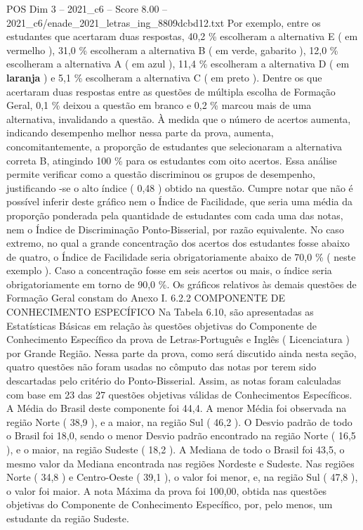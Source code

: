 \begin{textsample}{POS Dim 3 – 2021\_c6 – Score 8.00 – 2021\_c6/enade\_2021\_letras\_ing\_8809dcbd12.txt}
Por exemplo, entre os estudantes que acertaram duas respostas, 40,2 \% escolheram a alternativa E ( em vermelho ), 31,0 \% escolheram a alternativa B ( em verde, gabarito ), 12,0 \% escolheram a alternativa A ( em azul ), 11,4 \% escolheram a alternativa D ( em \textbf{laranja} ) e 5,1 \% escolheram a alternativa C ( em preto ).
Dentre os que acertaram duas respostas entre as questões de múltipla escolha de Formação Geral, 0,1 \% deixou a questão em branco e 0,2 \% marcou mais de uma alternativa, invalidando a questão.
À medida que o número de acertos aumenta, indicando desempenho melhor nessa parte da prova, aumenta, concomitantemente, a proporção de estudantes que selecionaram a alternativa correta B, atingindo 100 \% para os estudantes com oito acertos.
Essa análise permite verificar como a questão discriminou os grupos de desempenho, justificando -se o alto índice ( 0,48 ) obtido na questão.
Cumpre notar que não é possível inferir deste gráfico nem o Índice de Facilidade, que seria uma média da proporção ponderada pela quantidade de estudantes com cada uma das notas, nem o Índice de Discriminação Ponto-Bisserial, por razão equivalente.
No caso extremo, no qual a grande concentração dos acertos dos estudantes fosse abaixo de quatro, o Índice de Facilidade seria obrigatoriamente abaixo de 70,0 \% ( neste exemplo ).
Caso a concentração fosse em seis acertos ou mais, o índice seria obrigatoriamente em torno de 90,0 \%.
Os gráficos relativos às demais questões de Formação Geral constam do Anexo I. 6.2.2 COMPONENTE DE CONHECIMENTO ESPECÍFICO Na Tabela 6.10, são apresentadas as Estatísticas Básicas em relação às questões objetivas do Componente de Conhecimento Específico da prova de Letras-Português e Inglês ( Licenciatura ) por Grande Região.
Nessa parte da prova, como será discutido ainda nesta seção, quatro questões não foram usadas no cômputo das notas por terem sido descartadas pelo critério do Ponto-Bisserial.
Assim, as notas foram calculadas com base em 23 das 27 questões objetivas válidas de Conhecimentos Específicos.
A Média do Brasil deste componente foi 44,4.
A menor Média foi observada na região Norte ( 38,9 ), e a maior, na região Sul ( 46,2 ).
O Desvio padrão de todo o Brasil foi 18,0, sendo o menor Desvio padrão encontrado na região Norte ( 16,5 ), e o maior, na região Sudeste ( 18,2 ).
A Mediana de todo o Brasil foi 43,5, o mesmo valor da Mediana encontrada nas regiões Nordeste e Sudeste.
Nas regiões Norte ( 34,8 ) e Centro-Oeste ( 39,1 ), o valor foi menor, e, na região Sul ( 47,8 ), o valor foi maior.
A nota Máxima da prova foi 100,00, obtida nas questões objetivas do Componente de Conhecimento Específico, por, pelo menos, um estudante da região Sudeste.

\end{textsample}

